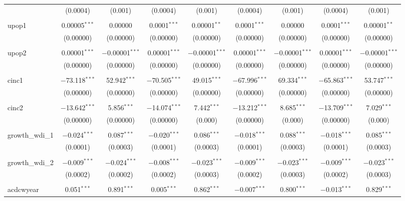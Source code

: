 \begin{table}[!htbp]
\begin{tabular}{@{\extracolsep{5pt}}lcccccccc}
  & (0.0004) & (0.001) & (0.0004) & (0.001) & (0.0004) & (0.001) & (0.0004) & (0.001) \\ 
  & & & & & & & & \\ 
 upop1 & 0.00005$^{***}$ & 0.00000 & 0.0001$^{***}$ & 0.00001$^{**}$ & 0.0001$^{***}$ & 0.00000 & 0.0001$^{***}$ & 0.00001$^{**}$ \\ 
  & (0.00000) & (0.00000) & (0.00000) & (0.00000) & (0.00000) & (0.00000) & (0.00000) & (0.00000) \\ 
  & & & & & & & & \\ 
 upop2 & 0.00001$^{***}$ & $-$0.00001$^{***}$ & 0.00001$^{***}$ & $-$0.00001$^{***}$ & 0.00001$^{***}$ & $-$0.00001$^{***}$ & 0.00001$^{***}$ & $-$0.00001$^{***}$ \\ 
  & (0.00000) & (0.00000) & (0.00000) & (0.00000) & (0.00000) & (0.00000) & (0.00000) & (0.00000) \\ 
  & & & & & & & & \\ 
 cinc1 & $-$73.118$^{***}$ & 52.942$^{***}$ & $-$70.505$^{***}$ & 49.015$^{***}$ & $-$67.996$^{***}$ & 69.334$^{***}$ & $-$65.863$^{***}$ & 53.747$^{***}$ \\ 
  & (0.00000) & (0.00000) & (0.00000) & (0.00000) & (0.00000) & (0.00000) & (0.00000) & (0.00000) \\ 
  & & & & & & & & \\ 
 cinc2 & $-$13.642$^{***}$ & 5.856$^{***}$ & $-$14.074$^{***}$ & 7.442$^{***}$ & $-$13.212$^{***}$ & 8.685$^{***}$ & $-$13.709$^{***}$ & 7.029$^{***}$ \\ 
  & (0.00000) & (0.00000) & (0.00000) & (0.000) & (0.00000) & (0.000) & (0.00000) & (0.000) \\ 
  & & & & & & & & \\ 
 growth\_wdi\_1 & $-$0.024$^{***}$ & 0.087$^{***}$ & $-$0.020$^{***}$ & 0.086$^{***}$ & $-$0.018$^{***}$ & 0.088$^{***}$ & $-$0.018$^{***}$ & 0.085$^{***}$ \\ 
  & (0.0001) & (0.0003) & (0.0001) & (0.0003) & (0.0001) & (0.0003) & (0.0001) & (0.0003) \\ 
  & & & & & & & & \\ 
 growth\_wdi\_2 & $-$0.009$^{***}$ & $-$0.024$^{***}$ & $-$0.008$^{***}$ & $-$0.023$^{***}$ & $-$0.009$^{***}$ & $-$0.023$^{***}$ & $-$0.009$^{***}$ & $-$0.023$^{***}$ \\ 
  & (0.0002) & (0.0002) & (0.0002) & (0.0003) & (0.0002) & (0.0003) & (0.0002) & (0.0003) \\ 
  & & & & & & & & \\ 
 acdcwyear & 0.051$^{***}$ & 0.891$^{***}$ & 0.005$^{***}$ & 0.862$^{***}$ & $-$0.007$^{***}$ & 0.800$^{***}$ & $-$0.013$^{***}$ & 0.829$^{***}$ \\ 

\end{tabular}
\end{table}
